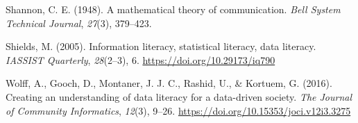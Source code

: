 \documentclass[
  12pt,
  a4paper,
  twoside]{article}
\newlength{\cslhangindent}
\newlength{\cslentryspacingunit} %
\newenvironment{CSLReferences}[2] %
 {%
  \setlength{\parindent}{0pt}
  \ifodd #1
  \let\oldpar\par
  \def\par{\hangindent=\cslhangindent\oldpar}
  \fi
  \setlength{\parskip}{#2\cslentryspacingunit}
 }%
 {}
\begin{document}
\begin{CSLReferences}{1}{0}
\leavevmode{}%
Shannon, C. E. (1948). A mathematical theory of communication. \emph{Bell System Technical Journal}, \emph{27}(3), 379--423.

\leavevmode{}%
Shields, M. (2005). Information literacy, statistical literacy, data literacy. \emph{IASSIST Quarterly}, \emph{28}(2--3), 6. \url{https://doi.org/10.29173/iq790}

\leavevmode{}%
Wolff, A., Gooch, D., Montaner, J. J. C., Rashid, U., \& Kortuem, G. (2016). Creating an understanding of data literacy for a data-driven society. \emph{The Journal of Community Informatics}, \emph{12}(3), 9--26. \url{https://doi.org/10.15353/joci.v12i3.3275}

\end{CSLReferences}
\end{document}
